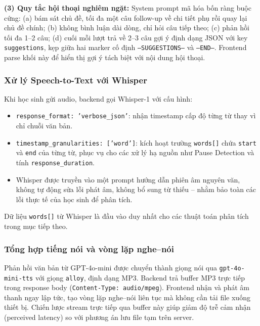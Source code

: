 \textbf{(3) Quy tắc hội thoại nghiêm ngặt:} System prompt mã hóa bốn ràng buộc cứng: (a) bám sát chủ đề, tối đa một câu follow-up về chi tiết phụ rồi quay lại chủ đề chính; (b) không bình luận dài dòng, chỉ hỏi câu tiếp theo; (c) phản hồi tối đa 1--2 câu; (d) cuối mỗi lượt trả về 2--3 câu gợi ý định dạng JSON với key \texttt{suggestions}, kẹp giữa hai marker cố định \texttt{---SUGGESTIONS---} và \texttt{---END---}. Frontend parse khối này để hiển thị gợi ý tách biệt với nội dung hội thoại.

\subsubsection{Xử lý Speech-to-Text với Whisper}

Khi học sinh gửi audio, backend gọi Whisper-1 \cite{openai_whisper} với cấu hình:

\begin{itemize}
    \item \texttt{response\_format: 'verbose\_json'}: nhận timestamp cấp độ từng từ thay vì chỉ chuỗi văn bản.
    \item \texttt{timestamp\_granularities: ['word']}: kích hoạt trường \texttt{words[]} chứa \texttt{start} và \texttt{end} của từng từ, phục vụ cho các xử lý hạ nguồn như Pause Detection và tính \texttt{response\_duration}.
    \item Whisper được truyền vào một prompt hướng dẫn phiên âm nguyên văn, không tự động sửa lỗi phát âm, không bổ sung từ thiếu -- nhằm bảo toàn các lỗi thực tế của học sinh để phân tích.
\end{itemize}

Dữ liệu \texttt{words[]} từ Whisper là đầu vào duy nhất cho các thuật toán phân tích trong mục tiếp theo.

\subsubsection{Tổng hợp tiếng nói và vòng lặp nghe--nói}

Phản hồi văn bản từ GPT-4o-mini được chuyển thành giọng nói qua \texttt{gpt-4o-mini-tts} với giọng \texttt{alloy}, định dạng MP3. Backend trả buffer MP3 trực tiếp trong response body (\texttt{Content-Type: audio/mpeg}). Frontend nhận và phát âm thanh ngay lập tức, tạo vòng lặp nghe--nói liên tục mà không cần tải file xuống thiết bị. Chiến lược stream trực tiếp qua buffer này giúp giảm độ trễ cảm nhận (perceived latency) so với phương án lưu file tạm trên server.

